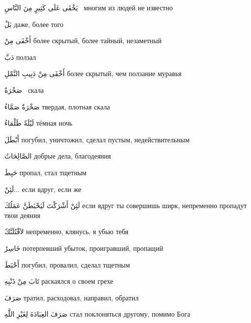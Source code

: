 \documentclass[a5paper]{article}
\newcommand\textstyleDropCaps[1]{#1}
\newcommand\textstyleCaptioncharacters[1]{#1}
\begin{document}
\textstyleCaptioncharacters{يَخْفَى عَلَى كَثِيرٍ مِنَ النَّاسِ \ }\textstyleDropCaps{многим из людей не известно ‎}

\textstyleCaptioncharacters{بَلْ }\textstyleDropCaps{даже, более того‎}

\textstyleCaptioncharacters{أَخْفَى مِنْ }\textstyleDropCaps{более скры­тый, более тайный, незаметный‎}

\textstyleCaptioncharacters{دَبَّ }\textstyleDropCaps{ползал‎}

\textstyleCaptioncharacters{أَخْفَى مِنْ دَبِيبِ النَّمْلِ }\textstyleDropCaps{более скрытый, чем ползание муравья ‎}

\textstyleCaptioncharacters{صَخْرَةٌ \ }\textstyleDropCaps{скала ‎}

\textstyleCaptioncharacters{صَخْرَةٌ صَمَّاءُ }\textstyleDropCaps{твердая, плотная скала‎}

\textstyleCaptioncharacters{لَيْلَةٌ ظَلْمَاءُ }\textstyleDropCaps{тёмная ночь‎}

\textstyleCaptioncharacters{أَبْطَلَ }\textstyleDropCaps{погубил, уничто­жил, сделал пустым, недействительным‎}

\textstyleCaptioncharacters{الصَّالِحَاتُ }\textstyleDropCaps{добрые дела, благодеяния‎}

\textstyleCaptioncharacters{حَبِطَ }\textstyleDropCaps{пропал, стал тщет­ным‎}

\textstyleCaptioncharacters{لَئِنْ... }\textstyleDropCaps{если вдруг, если же‎}

\textstyleCaptioncharacters{لَئِنْ أَشْرَكْتَ لَيَحْبَطَنَّ عَمَلُكَ }\textstyleDropCaps{если вдруг ты совершишь ширк, непременно пропадут твои деяния‎}

\textstyleCaptioncharacters{َلاَقْتُلَنَّكَ }\textstyleDropCaps{непременно, клянусь, я убью тебя‎}

\textstyleCaptioncharacters{خَاسِرٌ }\textstyleDropCaps{потерпевший убы­ток, проигравший, пропащий‎}

\textstyleCaptioncharacters{أَحْبَطَ }\textstyleDropCaps{погубил, прова­лил, сделал тщетным‎}

\textstyleCaptioncharacters{تَابَ مِنْ ذَنْبِهِ }\textstyleDropCaps{раскаял­ся о своем грехе ‎}

\textstyleCaptioncharacters{صَرَفَ }\textstyleDropCaps{тратил, расходо­вал, направил, обратил‎}

\textstyleCaptioncharacters{صَرَفَ العِبَادَةَ لِغَيْرِ اللَّهِ }\textstyleDropCaps{стал поклоняться другому, помимо Бога ‎}
\end{document}
